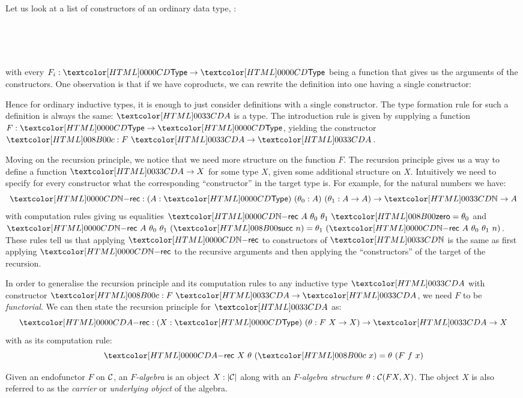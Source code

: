 Let us look at a list of constructors of an ordinary data type, \eg:
\begin{datatype}{\Aty}{\Type}
   \\
   \\
  \constrdots \\
\end{datatype}
with every $F_i : \Type \to \Type$ being a function that gives us the
arguments of the constructors. One observation is that if we have
coproducts, we can rewrite the definition into one having a single
constructor:
\begin{datatype}{\Aty}{\Type}
\end{datatype}
Hence for ordinary inductive types, it is enough to just consider
definitions with a single constructor. The type formation rule for
such a definition is always the same: $\Aty$ is a type. The
introduction rule is given by supplying a function
$F : \Type \to \Type$, yielding the constructor
$\Ac : F\ \Aty \to \Aty$.

Moving on the recursion principle, we notice that we need more
structure on the function $F$. The recursion principle gives us a way
to define a function $\Aty \to X$ for some type $X$, given some
additional structure on $X$. Intuitively we need to specify for every
constructor what the corresponding ``constructor'' in the target type
is. For example, for the natural numbers we have:
$$
\natrec : (A : \Type)\ (\theta_0 : A)\ (\theta_1 : A \to A) \to \natty \to A
$$
with computation rules giving us equalities
$\natrec\ A\ \theta_0\ \theta_1\ \natzero = \theta_0$ and
$\natrec\ A\ \theta_0\ \theta_1\ (\natsucc\ n) = \theta_1\ (\natrec\
A\ \theta_0\ \theta_1\ n)$.
These rules tell us that applying $\natrec$ to constructors of
$\natty$ is the same as first applying $\natrec$ to the recursive
arguments and then applying the ``constructors'' of the target of the
recursion.

In order to generalise the recursion principle and its computation
rules to any inductive type $\Aty$ with constructor
$\Ac : F\ \Aty \to \Aty$, we need $F$ to be \emph{functorial}. We can
then state the recursion principle for $\Aty$ as:
$$
\Arec : (X : \Type)\ (\theta : F\ X \to X) \to \Aty \to X
$$
with as its computation rule:
$$
\Arec\ X\ \theta\ (\Ac\ x) = \theta\ (F\ f\ x)
$$


\begin{definition}
  Given an endofunctor $F$ on $\mathcal{C}$, an \emph{$F$-algebra} is an
  object $X : | \mathcal{C} |$ along with an \emph{$F$-algebra structure}
  $\theta : \mathcal{C}(F X, X)$. The object $X$ is also referred to as the
  \emph{carrier} or \emph{underlying object} of the algebra.
\end{definition}

